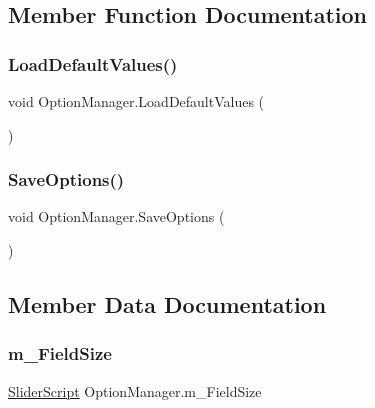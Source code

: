 \subsection{Member Function Documentation}
\mbox{\label{class_option_manager_acc81471769ebb4dd06e38321979a2b75}} 
\subsubsection{\texorpdfstring{LoadDefaultValues()}{LoadDefaultValues()}}
{\footnotesize\ttfamily void Option\+Manager.\+Load\+Default\+Values (\begin{DoxyParamCaption}{ }\end{DoxyParamCaption})}





\mbox{\label{class_option_manager_af95bd2a017f1bdb855bfc58faf79f963}} 
\subsubsection{\texorpdfstring{SaveOptions()}{SaveOptions()}}
{\footnotesize\ttfamily void Option\+Manager.\+Save\+Options (\begin{DoxyParamCaption}{ }\end{DoxyParamCaption})}







\subsection{Member Data Documentation}
\mbox{\label{class_option_manager_aea90a45fd893dc64ba1eefe6429a5252}} 
\subsubsection{\texorpdfstring{m\_FieldSize}{m\_FieldSize}}
{\footnotesize\ttfamily \mbox{\hyperlink{class_slider_script}{Slider\+Script}} Option\+Manager.\+m\+\_\+\+Field\+Size}

